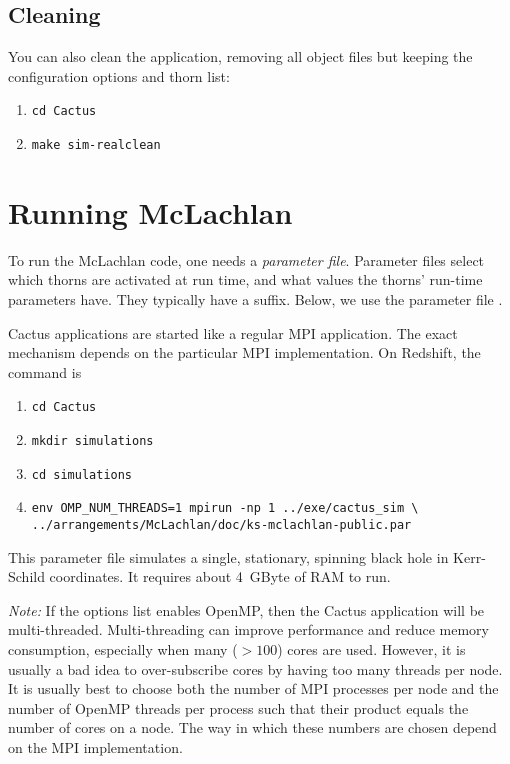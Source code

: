 \subsection{Cleaning}

You can also clean the application, removing all object files but
keeping the configuration options and thorn list:
\begin{enumerate}
\item\verb+cd Cactus+
\item\verb+make sim-realclean+
\end{enumerate}



\section{Running McLachlan}

To run the McLachlan code, one needs a \emph{parameter file}.
Parameter files select which thorns are activated at run time, and
what values the thorns' run-time parameters have.  They typically have
a  suffix.  Below, we use the parameter file
.

Cactus applications are started like a regular MPI application.  The
exact mechanism depends on the particular MPI implementation.  On
Redshift, the command is
\begin{enumerate}
\item\verb+cd Cactus+
\item\verb+mkdir simulations+
\item\verb+cd simulations+
\item\verb+env OMP_NUM_THREADS=1 mpirun -np 1 ../exe/cactus_sim \+
\verb+   ../arrangements/McLachlan/doc/ks-mclachlan-public.par+
\end{enumerate}
This parameter file simulates a single, stationary, spinning black
hole in Kerr-Schild coordinates.  It requires about 4~GByte of RAM to
run.

\emph{Note:} If the options list enables OpenMP, then the Cactus
application will be multi-threaded.  Multi-threading can improve
performance and reduce memory consumption, especially when many
($>100$) cores are used.  However, it is usually a bad idea to
over-subscribe cores by having too many threads per node.  It is
usually best to choose both the number of MPI processes per node and
the number of OpenMP threads per process such that their product
equals the number of cores on a node.  The way in which these numbers
are chosen depend on the MPI implementation.








